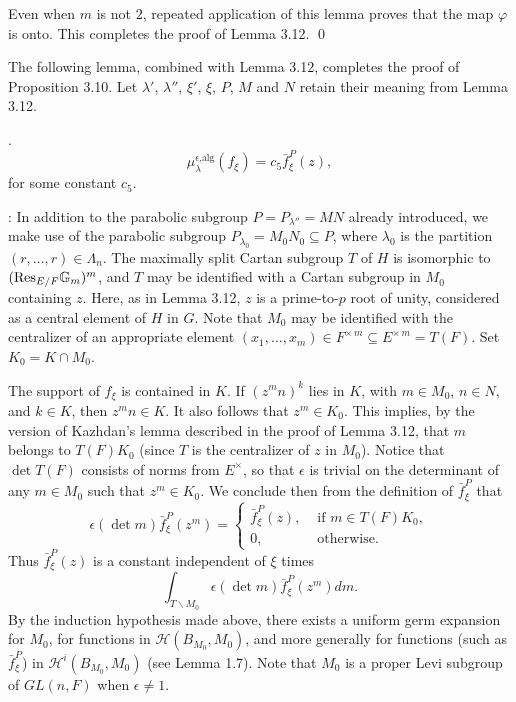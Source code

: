 \documentclass{amsart}
\begin{document}
Even when $m$ is not $2$, repeated application of this lemma
proves that the map $\varphi$ is onto.  This completes the
proof of Lemma 3.12.
\qed
\finishpproclaim

The following lemma, combined with Lemma 3.12, completes the proof
of Proposition 3.10.  Let $\lambda'$, $\lambda''$, $\xi'$, $\xi$, $P$,
$M$ and $N$ retain their meaning from Lemma 3.12.

.  
$$\mu_\lambda^{\epsilon\text{,alg}}(f_\xi) = c_5 \bar f^P_\xi(z),$$
for some constant $c_5$.
\finishproclaim

:  In addition to the parabolic subgroup
$P=P_{\lambda''}=MN$ already introduced, we make use of the parabolic subgroup
$P_{\lambda_0}=M_0N_0\subseteq P$, where $\lambda_0$ is the
partition $(r,\ldots, r)\in \Lambda_n$.  The maximally split
Cartan subgroup $T$ of $H$ is isomorphic to $(\text{Res}_{E/F}{\Bbb G}_m)^m$,
and $T$ may be identified with a Cartan subgroup in $M_0$ containing $z$.
Here, as in Lemma 3.12, $z$ is a prime-to-$p$ root of unity, considered
as a central element of $H$ in $G$.  Note that $M_0$ may be identified
with the centralizer of an appropriate element 
$(x_1,\ldots,x_m)\in F^{\times\,m}\subseteq
E^{\times\,m} = T(F)$.  Set $K_0 = K\cap M_0$.

The support of $f_\xi$ is contained in $K$.  If $(z^mn)^k$ lies in $K$,
with $m\in M_0$, $n\in N$, and $k\in K$, then $z^mn\in K$.  It also follows
 that $z^m\in K_0$.  This implies, by the version of Kazhdan's lemma
 described in the proof of Lemma 3.12,
 that $m$ belongs to $T(F)K_0$ (since $T$ is the centralizer of $z$ in $M_0$).
 Notice that $\det T(F)$ consists of norms from $E^\times$, so that
 $\epsilon$ is trivial on the determinant of any $m\in M_0$ such that $z^m\in K_0$.
 We conclude then from the definition of $\bar f_\xi^P$ that
 $$\epsilon(\det m)\bar f_\xi^P(z^m) = 
  \begin{cases} 
	\bar f^P_\xi(z), & \text{ if }m\in T(F)K_0,\\
	0, & \text{ otherwise. }\end{cases}
	$$
Thus $\bar f_\xi^P(z)$ is a constant independent of $\xi$ times
$$\int_{T\backslash M_0} \epsilon(\det m) \bar f_\xi^P(z^m) dm.$$
By the induction hypothesis made above, there exists a
uniform germ expansion for $M_0$, for functions in ${\mathcal H}(B_{M_0},M_0)$,
and more generally for functions (such as $\bar f_\xi^P$) in ${\mathcal H}^i
(B_{M_0},M_0)$ (see Lemma 1.7).  
Note that $M_0$ is a proper Levi subgroup of
$GL(n,F)$ when $\epsilon\ne 1$.  
\end{document}
